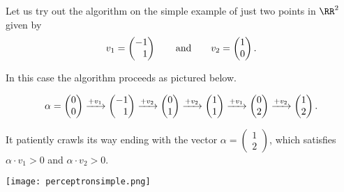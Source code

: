 \documentclass{article}
\newcommand{\vect}[2]{\begin{pmatrix} #1 \\ #2 \end{pmatrix}}
\newcommand{\hphm}{\hphantom{-}}
\begin{document}
\begin{example}
Let us try out the algorithm on the simple example of just
two points in $\RR^2$ given by
$$
v_1 = \vect{-1}{\hphm 1}\qquad\text{and}\qquad v_2 =
\vect{1}{0}.
$$

In this case the algorithm proceeds as pictured below.



$$
\alpha = \vect{0}{0}\xrightarrow{+v_1} \vect{-1}{\hphm 1} \xrightarrow{+v_2} \vect{0}{1} \xrightarrow{+v_2}\vect{1}{1} \xrightarrow{+v_1}\vect{0}{2} \xrightarrow{+v_2} \vect{1}{2}.
$$

It patiently crawls its way ending with the vector $\alpha = \vect{1}{2}$, which
satisfies $\alpha\cdot v_1 > 0$ and $\alpha\cdot v_2 > 0$.

\texttt{[image: perceptronsimple.png]}

\end{example}
\end{document}
